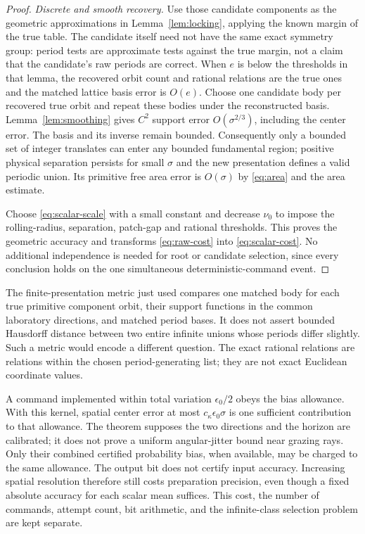 \begin{proof}
\emph{Discrete and smooth recovery.}
Use those candidate components as the geometric approximations in
Lemma~\ref{lem:locking}, applying the known margin of the true table.
The candidate itself need not have the same exact symmetry group:
period tests are approximate tests against the true margin, not a
claim that the candidate's raw periods are correct. When $e$ is below
the thresholds in that lemma, the recovered orbit count and rational
relations are the true ones and the matched lattice basis error is
$O(e)$. Choose one candidate body per recovered true orbit and repeat
these bodies under the reconstructed basis. Lemma~\ref{lem:smoothing}
gives $C^2$ support error $O(\sigma^{2/3})$, including the center error.
The basis and its inverse remain bounded. Consequently only a bounded
set of integer translates can enter any bounded fundamental region;
positive physical separation persists for small $\sigma$ and the
new presentation defines a valid periodic union. Its primitive free
area error is $O(\sigma)$ by \eqref{eq:area} and the area estimate.

Choose \eqref{eq:scalar-scale} with a small constant and decrease
$\nu_0$ to impose the rolling-radius, separation, patch-gap and rational
thresholds. This proves the geometric accuracy and transforms
\eqref{eq:raw-cost} into \eqref{eq:scalar-cost}. No additional
independence is needed for root or candidate selection, since every
conclusion holds on the one simultaneous deterministic-command event.
\end{proof}

The finite-presentation metric just used compares one matched body for
each true primitive component orbit, their support functions in the
common laboratory directions, and matched period bases. It does not
assert bounded Hausdorff distance between two entire infinite unions
whose periods differ slightly. Such a metric would encode a different
question. The exact rational relations are relations within the chosen
period-generating list; they are not exact Euclidean coordinate values.

\begin{remark}\label{rem:resources}
A command implemented within total variation $\epsilon_0/2$ obeys the
bias allowance. With this kernel, spatial center error at most
$c_\kappa\epsilon_0\sigma$ is one sufficient contribution to that
allowance. The theorem supposes the two directions and the horizon
are calibrated; it does not prove a uniform angular-jitter bound near
grazing rays. Only their combined certified probability bias, when
available, may be charged to the same allowance. The output bit does
not certify input accuracy. Increasing spatial resolution therefore
still costs preparation precision, even though a fixed absolute accuracy
for each scalar mean suffices. This cost, the number of commands,
attempt count, bit arithmetic, and the infinite-class selection problem
are kept separate.
\end{remark}

